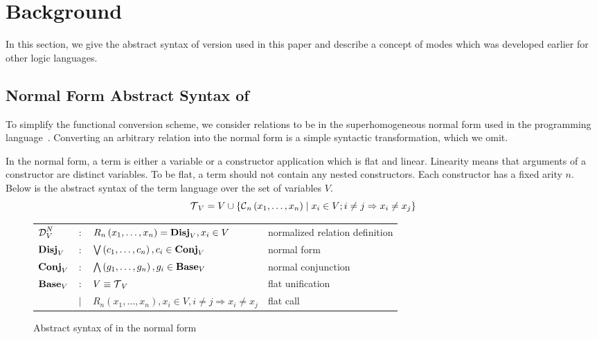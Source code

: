 \section{Background}

In this section, we give the abstract syntax of \micro version used in this paper and describe a concept of modes which was developed earlier for other logic languages.

\subsection{Normal Form Abstract Syntax of \micro}

To simplify the functional conversion scheme, we consider \micro relations to be in the superhomogeneous normal form used in the \merc programming language~\cite{somogyi1996execution}.
Converting an arbitrary \micro relation into the normal form is a simple syntactic transformation, which we omit.

In the normal form, a term is either a variable or a constructor application which is flat and linear.
Linearity means that arguments of a constructor are distinct variables.
To be flat, a term should not contain any nested constructors.
Each constructor has a fixed arity $n$.
Below is the abstract syntax of the term language over the set of variables $V$.
\[  \operatorname{\mathcal{T}}_{V} = V \cup \{\operatorname{\mathcal{C}}_{n}\left( x_1, \ldots, x_{n} \right) \mid x_{i}\in V; i \neq j \Rightarrow x_i \neq x_j\} \]

\begin{figure*}[t]
    \begin{tabular}{llll}
        $\operatorname{\mathcal{D}}_{V}^N$ & $:$    & $R_{n}\left( x_1, \ldots, x_{n} \right) = \operatorname{\mathbf{Disj}}_{V}, x_{i}\in V$                        & normalized relation definition \\
        $\operatorname{\mathbf{Disj}}_{V}$  & $:$    & $\bigvee\left( c_1, \ldots, c_{n} \right), c_{i}\in \operatorname{\mathbf{Conj}}_{V}$                          & normal form                    \\
        $\operatorname{\mathbf{Conj}}_{V}$  & $:$    & $\bigwedge\left( g_1, \ldots, g_n \right), g_{i}\in \operatorname{\mathbf{Base}}_{V}$                          & normal conjunction             \\
        $\operatorname{\mathbf{Base}}_{V}$  & $:$    & $V \equiv \operatorname{\mathcal{T}}_{V}$                                                                & flat unification               \\
                     & $\mid$ & $R_{n}\left( x_1, \ldots, x_{n} \right), x_{i}\in V, i \neq j \Rightarrow x_i \neq x_j$ & flat call                      \\

    \end{tabular}
    \caption{Abstract syntax of \micro in the normal form}
    \label{fig:miniKanren}
\end{figure*}

